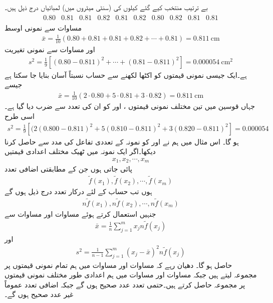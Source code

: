 \quad {}\\
بے ترتیب منتخب کیے گئے کیلوں کی  (سنٹی میٹروں میں) لمبائیاں درج ذیل ہیں۔
\begin{align*}
\begin{array}{cccccccccc}
0.80&0.81&0.81&0.82&0.81&0.82&0.80&0.82&0.81&0.81
\end{array}
\end{align*}
مساوات  سے نمونی اوسط
\begin{align*}
\bar{x}=\frac{1}{10}(0.80+0.81+0.81+0.82+\cdots+0.81)=\SI{0.811}{\centi\meter}
\end{align*}
اور مساوات  سے نمونی تغیریت
\begin{align*}
s^2=\frac{1}{9}[(0.80-0.811)^2+\cdots+(0.81-0.811)^2]=\SI{0.000054}{\centi\meter\squared}
\end{align*}
ہے۔ایک جیسی نمونی قیمتوں کو اکٹھا لکھنے سے حساب نسبتاً آسان بنایا جا سکتا ہے جیسے
\begin{align*}
\bar{x}=\frac{1}{10}(2\cdot 0.80+5\cdot 0.81+3\cdot 0.82)=\SI{0.811}{\centi\meter}
\end{align*} 
جہاں قوسین میں تین مختلف نمونی قیمتوں ،  اور  کو ان کی تعدد سے ضرب دیا گیا ہے۔اسی طرح
\begin{align*}
s^2=\frac{1}{9}[(2(0.800-0.811)^2+5(0.810-0.811)^2+3(0.820-0.811)^2]=\num{0.000054}
\end{align*}
ہو گا۔
اس مثال میں ہم نے  اور  کو نمونہ کے تعددی تفاعل  کی مدد سے حاصل کرنا دیکھا۔اگر ایک نمونہ میں ٹھیک  مختلف اعدادی قیمتیں 
\begin{align*}
x_1, x_2,\cdots, x_m
\end{align*}
پائی جاتی ہوں جن کے مطابقتی اضافی تعدد
\begin{align*}
\tilde{f}(x_1),\tilde{f}(x_2),\cdots,\tilde{f}(x_m)
\end{align*}
ہوں تب حساب کے لئے درکار تعدد درج ذیل ہوں گے
\begin{align*}
n\tilde{f}(x_1),n\tilde{f}(x_2),\cdots,n\tilde{f}(x_m)
\end{align*}
جنہیں استعمال کرتے ہوئے مساوات  اور مساوات  سے
\begin{align}\label{مساوات_شماریات_نمونی_اوسط_پ}
\bar{x}=\frac{1}{n}\sum_{j=1}^{m}x_jn\tilde{f}(x_j)
\end{align}
اور
\begin{align}\label{مساوات_شماریات_نمونی_اوسط_ت}
s^2=\frac{1}{n-1}\sum_{j=1}^{m} (x_j-\bar{x})^2n\tilde{f}(x_j)
\end{align}
حاصل ہو گا۔ دھیان رہے کہ مساوات  اور مساوات  میں ہم تمام نمونی قیمتوں پر مجموعہ لیتے ہیں جبکہ مساوات  اور مساوات  میں ہم اعدادی طور مختلف نمونی قیمتوں پر مجموعہ حاصل کرتے ہیں۔حتمی تعدد  عدد صحیح ہوں گے جبکہ اضافی تعدد  عموماً غیر عدد صحیح ہوں گے۔

